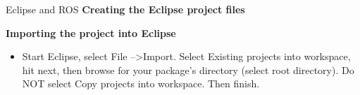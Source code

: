 \documentclass{beamer}
\begin{document}
\begin{frame}{Eclipse and ROS\cite{ROS:2015:Online}}
 \textbf{Creating the Eclipse project files}
 
 
 
 \textbf{Importing the project into Eclipse}
 \begin{itemize}
 \item Start Eclipse, select File  --\textgreater  Import. Select  Existing projects into workspace, hit next, then browse for your package's directory (select root directory). Do NOT select Copy projects into workspace. Then finish.
 \end{itemize}
\end{frame}
\end{document}
